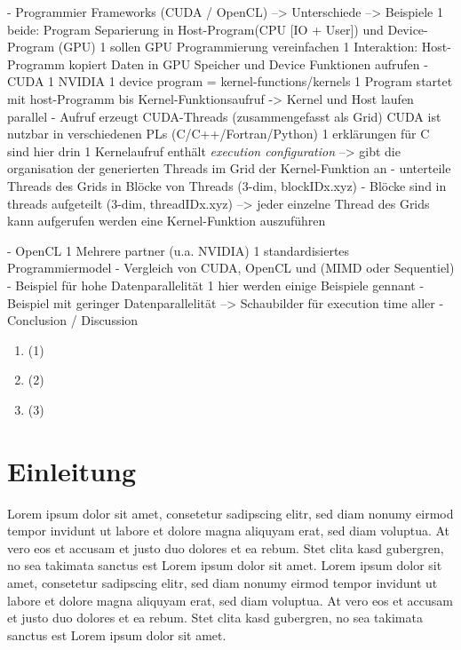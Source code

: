 \documentclass[a4paper,12pt]{llncs}
\numberwithin{equation}{section}
\begin{document}
    
    
  - Programmier Frameworks (CUDA / OpenCL)	
    --> Unterschiede
    --> Beispiele
    1 beide: Program Separierung in Host-Program(CPU [IO + User]) und Device-Program (GPU)
    1 sollen GPU Programmierung vereinfachen
    1 Interaktion: Host-Programm kopiert Daten in GPU Speicher und Device Funktionen aufrufen
    - CUDA
      1 NVIDIA
      1 device program = kernel-functions/kernels
      1 Program startet mit host-Programm bis Kernel-Funktionsaufruf -> Kernel und Host laufen parallel
      	- Aufruf erzeugt CUDA-Threads (zusammengefasst als Grid)
      CUDA ist nutzbar in verschiedenen PLs (C/C++/Fortran/Python)
      1 erklärungen für C sind hier drin
	  1 Kernelaufruf enthält \textit{execution configuration}
	  	--> gibt die organisation der generierten Threads im Grid der Kernel-Funktion an
	  	  - unterteile Threads des Grids in Blöcke von Threads (3-dim, blockIDx.xyz)
	  	  - Blöcke sind in threads aufgeteilt (3-dim, threadIDx.xyz)
	   --> jeder einzelne Thread des Grids kann aufgerufen werden eine Kernel-Funktion auszuführen      
             
      
    - OpenCL
      1 Mehrere partner (u.a. NVIDIA) 
      1 standardisiertes Programmiermodel
- Vergleich von CUDA, OpenCL und (MIMD oder Sequentiel)
  - Beispiel für hohe Datenparallelität
  	1 hier werden einige Beispiele gennant
  - Beispiel mit geringer Datenparallelität
  --> Schaubilder für execution time aller 
- Conclusion / Discussion

\begin{enumerate}
\item \cite{Rauber.2012} (1)
\item \cite{Lindholm.2008} (2)
\item \cite{Burgess.2020} (3)
\end{enumerate}



\section{Einleitung}
Lorem ipsum dolor sit amet, consetetur sadipscing elitr, sed diam nonumy eirmod tempor invidunt ut labore et dolore magna aliquyam erat, sed diam voluptua. At vero eos et accusam et justo duo dolores et ea rebum. Stet clita kasd gubergren, no sea takimata sanctus est Lorem ipsum dolor sit amet. Lorem ipsum dolor sit amet, consetetur sadipscing elitr, sed diam nonumy eirmod tempor invidunt ut labore et dolore magna aliquyam erat, sed diam voluptua. At vero eos et accusam et justo duo dolores et ea rebum. Stet clita kasd gubergren, no sea takimata sanctus est Lorem ipsum dolor sit amet.
\end{document}
